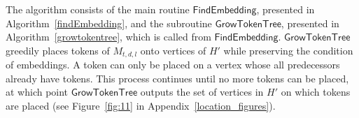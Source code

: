 \documentclass[runningheads]{llncs}
\theoremstyle{plain}
\theoremstyle{definition}
\begin{document}
The algorithm consists of the main routine $\mathsf{FindEmbedding}$, presented in Algorithm~\ref{findEmbedding}, and the subroutine $\mathsf{GrowTokenTree}$, presented in Algorithm~\ref{growtokentree}, which is called from $\mathsf{FindEmbedding}$. $\mathsf{GrowTokenTree}$ greedily places tokens of $M_{t, d, l}$ onto vertices of $H'$ while preserving the condition of embeddings. A token can only be placed on a vertex whose all predecessors already have tokens. This process continues until no more tokens can be placed, at which point $\mathsf{GrowTokenTree}$ outputs the set of vertices in $H'$ on which tokens are placed (see Figure~\ref{fig:11} in Appendix~\ref{location_figures}).

\begin{comment}
\ifthenelse{\boolean{Draft}}{
\begin{figure}[t]
    \centering
    \texttt{[image: pic12.eps]}
    \caption{Illustration of token replacement in $\mathsf{FindEmbedding}$. A vertex $v$ satisfying the condition in Line 5 of the pseudocode (Algorithm \ref{findEmbedding}) and the token $T$ placed at $v$ are selected ($M_{t, d, l}$ left, $H'$ left), and $T$ is removed from $v$. Subsequently, $T$'s all \textit{tokened} descendants $T\cdot b \cdot S$ ($1 \leq b \leq d$ and $S$ is a string of arbitrary length) are replaced with $T \cdot S$ on $H'$.}
    \label{fig:12}
\end{figure}
}
\end{comment}


\end{document}
